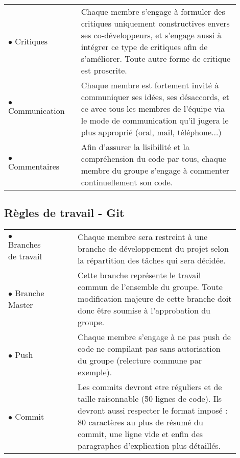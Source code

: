 \documentclass[a4paper,11pt]{article}
\begin{document}
\begin{spacing}{1.3}
\begin{tabular}{p{0.2\linewidth} p{0.005\linewidth} p{0.7\linewidth} }
		  $\bullet$ Critiques & & Chaque membre s'engage à formuler des critiques uniquement constructives envers ses co-développeurs, et s'engage aussi à intégrer ce type de critiques afin de s'améliorer. Toute autre forme de critique est proscrite.\\[0.3cm]
		  $\bullet$ Communication & & Chaque membre est fortement invité à communiquer ses idées, ses désaccords, et ce avec tous les membres de l'équipe via le mode de communication qu'il jugera le plus approprié (oral, mail, téléphone...)\\[0.3cm]
		  $\bullet$ Commentaires & & Afin d'assurer la lisibilité et la compréhension du code par tous, chaque membre du groupe s'engage à commenter continuellement son code.\\
		
		
		\end{tabular}



                  
		\subsection*{Règles de travail - Git}
		
		\begin{tabular}{p{0.2\linewidth} p{0.005\linewidth} p{0.7\linewidth} }
		
                  $\bullet$ Branches de travail & & Chaque membre sera restreint à une branche de développement du projet selon la répartition des tâches qui sera décidée.\\[0.3cm]
		  $\bullet$ Branche Master & & Cette branche représente le travail commun de l'ensemble du groupe. Toute modification majeure de cette branche doit donc être soumise à l'approbation du groupe.\\[0.3cm]
		  $\bullet$ Push & & Chaque membre s'engage à ne pas push de code ne compilant pas sans autorisation du groupe (relecture commune par exemple).\\[0.3cm]
		$\bullet$  Commit   &  &  Les  commits   devront  etre
                  réguliers et  de taille raisonnable (\~50  lignes de
                  code). Ils devront aussi  respecter le format imposé
                  : 80  caractères au  plus de  résumé du  commit, une
                  ligne  vide et  enfin des  paragraphes d'explication
                  plus détaillés.

                \end{tabular}
		
		\thispagestyle{fancy}

		
	\end{spacing}
\end{document}
